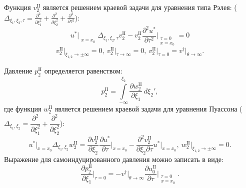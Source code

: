 \documentclass[../master.tex]{subfiles}
\begin{document}
Функция $v_2^{\text{II}}$ является решением краевой задачи для уравнения типа Рэлея: ($\displaystyle \Delta_{\xi_1, \xi_2, \tau} = \frac{\partial^2}{\partial  \xi_1^2} + \frac{\partial^2}{\partial \xi_2^2} + \frac{\partial^2}{\partial \tau^2}$):
\[ u^*\big|_{\begin{smallmatrix} \\ x=x_0  \end{smallmatrix}}\Delta_{\xi_1, \xi_2, \tau}v_2^{\text{II}} - v_2^{\text{II}}\dfrac{\partial^2 u^*}{\partial \tau^2}\bigg|_{\begin{smallmatrix} \tau=0\\ x=x_0 \end{smallmatrix}} = 0\]
\[ v_2^{\text{II}} \big|_{\xi_{1,2} \rightarrow \pm \infty} = 0, \
 v_2^{\text{II}} \big|_{\tau \rightarrow \infty} = 0, \
v_2^{\text{II}} \big|_{\tau =0} = v^{\dagger}\big|_{\theta \rightarrow \infty}.\]


Давление $p_2^{\text{II}}$  определяется равенством:
\[
p_2^\mathrm{II} = \int\limits_{-\infty}^{\xi_2} \frac{\partial w_2^\mathrm{II}}{\partial \xi_1}\,d\xi_2',
\]
где функция $w_2^{\text{II}}$ является решением краевой задачи для уравнения Пуассона ($\Delta_{\xi_1, \xi_2} = \dfrac{\partial^2}{\partial  \xi_1^2} + \dfrac{\partial^2}{\partial \xi_2^2}$):
\[
u^*\big|_{ x=x_0} \Delta_{\xi_1, \xi_2}w_2^{\text{II}} = \dfrac{\partial v_2^{\text{II}}}{\partial \xi_2}\dfrac{\partial u^*}{\partial \tau}\bigg|_{x=x_0}\!\!\! - \dfrac{\partial^2 v_2^{\text{II}}}{\partial \xi_2 \partial\tau}u^*\big|_{x=x_0 },\
w_2^{\text{II}} \big|_{\xi_{1,2} \rightarrow \pm \infty} = 0.
\]
 Выражение для самоиндуцированного давления можно записать в виде:
\[
\dfrac{\partial p_2^{\text{II}}}{\partial \xi_1}\bigg|_{\tau=0} =- v^\dagger\big|_{\theta\to\infty} \dfrac{\partial u_0^{\text{II}}}{\partial \tau}\bigg|_{\begin{smallmatrix}
   \tau=0 \\ x=x_0 \end{smallmatrix}}.
\]
\end{document}

